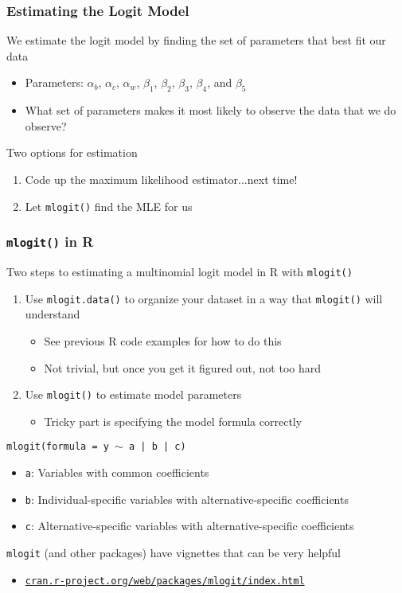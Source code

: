 \documentclass{beamer}\usepackage[]{graphicx}\usepackage[]{color}
\begin{document}
\begin{frame}\frametitle{Estimating the Logit Model}
    We estimate the logit model by finding the set of parameters that best fit our data
    \begin{itemize}
    	\item Parameters: $\alpha_b$, $\alpha_c$, $\alpha_w$, $\beta_1$, $\beta_2$, $\beta_3$, $\beta_4$, and $\beta_5$
    	\item What set of parameters makes it most likely to observe the data that we do observe?
    \end{itemize}
    \vspace{3ex}
    Two options for estimation
    \begin{enumerate}
    	\item Code up the maximum likelihood estimator...next time!
    	\item Let \texttt{mlogit()} find the MLE for us
    \end{enumerate}
\end{frame}

\begin{frame}\frametitle{\texttt{mlogit()} in R}
    Two steps to estimating a multinomial logit model in R with \texttt{mlogit()}
    \begin{enumerate}
    	\item Use \texttt{mlogit.data()} to organize your dataset in a way that \texttt{mlogit()} will understand
    	\begin{itemize}
    		\item See previous R code examples for how to do this
    		\item Not trivial, but once you get it figured out, not too hard
    	\end{itemize}
    	\item Use \texttt{mlogit()} to estimate model parameters
    	\begin{itemize}
    		\item Tricky part is specifying the model formula correctly
    	\end{itemize}
    \end{enumerate}
    \vspace{2ex}
    \texttt{mlogit(formula = y $\sim$ a | b | c)}
    \begin{itemize}
    	\item \texttt{a}: Variables with common coefficients
    	\item \texttt{b}: Individual-specific variables with alternative-specific coefficients
    	\item \texttt{c}: Alternative-specific variables with alternative-specific coefficients
    \end{itemize}
    \vspace{2ex}
    \texttt{mlogit} (and other packages) have vignettes that can be very helpful
    \begin{itemize}
    	\item \href{https://cran.r-project.org/web/packages/mlogit/index.html}{\texttt{cran.r-project.org/web/packages/mlogit/index.html}}
    \end{itemize}
\end{frame}
\end{document}

